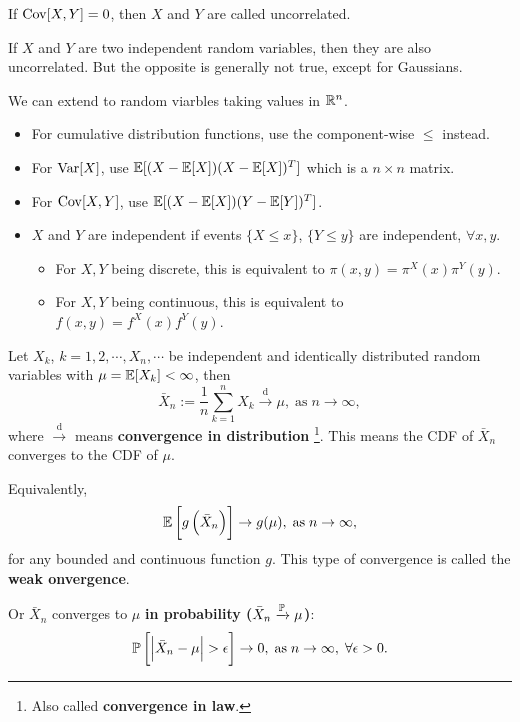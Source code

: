 \begin{definition}
    If $\mathrm{Cov} [X, Y] = 0$, then $X$ and $Y$ are called uncorrelated. 
\end{definition}

\begin{proposition}
    If $X$ and $Y$ are two independent random variables, then they are also uncorrelated. But the opposite is generally not true, except for Gaussians.
\end{proposition}

We can extend to random viarbles taking values in $\mathbb{R}^n$.
\begin{itemize}
    \item For \textcolor{myblue}{cumulative distribution functions}, use the component-wise $\le$ instead.
    \item For $\mathrm{Var} [X]$, use $\mathbb{E} [ (X - \mathbb{E}[X]) (X - \mathbb{E}[X])^T]$ which is a $n \times n$ matrix.
    \item For $\mathrm{Cov} [X,Y]$, use $\mathbb{E} [ (X - \mathbb{E}[X]) (Y - \mathbb{E}[Y])^T]$.
    \item $X$ and $Y$ are independent if events $\{X \le x\}$, $\{Y \le y\}$ are independent, $\forall x, y$.
    \begin{itemize}
        \item For $X, Y$ being discrete, this is equivalent to $\pi (x, y) = \pi^X(x) \pi^Y(y)$.
        \item For $X, Y$ being continuous, this is equivalent to $f(x, y) = f^X(x) f^Y(y)$.
    \end{itemize}  
\end{itemize}   

\begin{theorem}
    Let $X_k$, $k = 1, 2, \cdots, X_n, \cdots$ be independent and identically distributed random variables with $\mu = \mathbb{E} [X_k] < \infty$, then 
    \begin{equation*}
        \bar{X}_n := \frac{1}{n} \sum_{k=1}^n X_k \xrightarrow{\text{d}} \mu, \; \text{as} \; n \to \infty,
    \end{equation*}
    where $\xrightarrow{\text{d}}$ means \textbf{\textcolor{myblue}{convergence in distribution}} \footnote{Also called \textbf{\textcolor{myblue}{convergence in law}}.}. This means the CDF of $\bar{X}_n$ converges to the CDF of $\mu$.

    Equivalently, 
    \begin{equation*}
        \mathbb{E} \left[ g \left( \bar{X}_n \right) \right] \to g(\mu), \; \text{as} \; n \to \infty,
    \end{equation*}
    for any bounded and continuous function $g$. This type of convergence is called the \textbf{\textcolor{myblue}{weak onvergence}}.

    Or $\bar{X}_n$ converges to $\mu$ \textbf{\textcolor{myblue}{in probability ($\bar{X}_n \xrightarrow{\mathbb{P}} \mu$)}}:
    \begin{equation*}
        \mathbb{P} \left[ \left| \bar{X}_n - \mu \right| > \epsilon \right] \to 0, \; \text{as} \; n \to \infty, \; \forall \epsilon > 0.
    \end{equation*}
\end{theorem}

